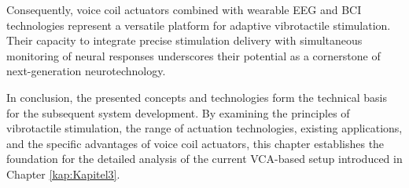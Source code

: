 Consequently, voice coil actuators combined with wearable EEG and BCI technologies represent a versatile platform for adaptive vibrotactile stimulation. Their capacity to integrate precise stimulation delivery with simultaneous monitoring of neural responses underscores their potential as a cornerstone of next-generation neurotechnology.

In conclusion, the presented concepts and technologies form the technical basis for the subsequent system development. By examining the principles of vibrotactile stimulation, the range of actuation technologies, existing applications, and the specific advantages of voice coil actuators, this chapter establishes the foundation for the detailed analysis of the current VCA-based setup introduced in Chapter \ref{kap:Kapitel3}.
